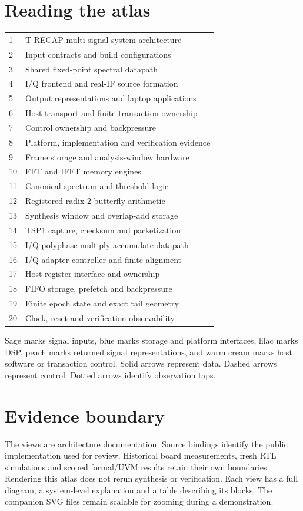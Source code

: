 \documentclass[11pt,letterpaper]{article}
\begin{document}
\section*{Reading the atlas}
\begin{tabularx}{\linewidth}{@{}p{0.35in}X@{}}\toprule
1 & T-RECAP multi-signal system architecture \\
2 & Input contracts and build configurations \\
3 & Shared fixed-point spectral datapath \\
4 & I/Q frontend and real-IF source formation \\
5 & Output representations and laptop applications \\
6 & Host transport and finite transaction ownership \\
7 & Control ownership and backpressure \\
8 & Platform, implementation and verification evidence \\
9 & Frame storage and analysis-window hardware \\
10 & FFT and IFFT memory engines \\
11 & Canonical spectrum and threshold logic \\
12 & Registered radix-2 butterfly arithmetic \\
13 & Synthesis window and overlap-add storage \\
14 & TSP1 capture, checksum and packetization \\
15 & I/Q polyphase multiply-accumulate datapath \\
16 & I/Q adapter controller and finite alignment \\
17 & Host register interface and ownership \\
18 & FIFO storage, prefetch and backpressure \\
19 & Finite epoch state and exact tail geometry \\
20 & Clock, reset and verification observability \\
\bottomrule\end{tabularx}
\par\vspace{10pt}
Sage marks signal inputs, blue marks storage and platform interfaces, lilac marks DSP, peach marks returned signal representations, and warm cream marks host software or transaction control. Solid arrows represent data. Dashed arrows represent control. Dotted arrows identify observation taps.
\section*{Evidence boundary}
The views are architecture documentation. Source bindings identify the public implementation used for review. Historical board measurements, fresh RTL simulations and scoped formal/UVM results retain their own boundaries. Rendering this atlas does not rerun synthesis or verification.
Each view has a full diagram, a system-level explanation and a table describing its blocks. The companion SVG files remain scalable for zooming during a demonstration.
\clearpage
\end{document}
